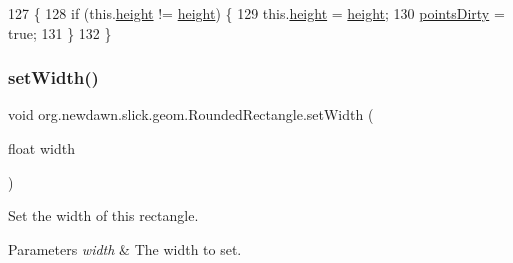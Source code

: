 \begin{DoxyCode}
127                                         \{
128         \textcolor{keywordflow}{if} (this.\mbox{\hyperlink{classorg_1_1newdawn_1_1slick_1_1geom_1_1_rectangle_a3bd010fdce636fc11ed0e0ad4d4b4a0a}{height}} != \mbox{\hyperlink{classorg_1_1newdawn_1_1slick_1_1geom_1_1_rectangle_a3bd010fdce636fc11ed0e0ad4d4b4a0a}{height}}) \{
129             this.\mbox{\hyperlink{classorg_1_1newdawn_1_1slick_1_1geom_1_1_rectangle_a3bd010fdce636fc11ed0e0ad4d4b4a0a}{height}} = \mbox{\hyperlink{classorg_1_1newdawn_1_1slick_1_1geom_1_1_rectangle_a3bd010fdce636fc11ed0e0ad4d4b4a0a}{height}};
130             \mbox{\hyperlink{classorg_1_1newdawn_1_1slick_1_1geom_1_1_shape_a61fe1954d2fdefc72c34b284f4fcfdb4}{pointsDirty}} = \textcolor{keyword}{true};
131         \}
132     \}
\end{DoxyCode}
\mbox{\label{classorg_1_1newdawn_1_1slick_1_1geom_1_1_rounded_rectangle_aa4e064365c4f35fb96ed8f5b58e6c25d}} 
\subsubsection{\texorpdfstring{set\+Width()}{setWidth()}}
{\footnotesize\ttfamily void org.\+newdawn.\+slick.\+geom.\+Rounded\+Rectangle.\+set\+Width (\begin{DoxyParamCaption}\item[{float}]{width }\end{DoxyParamCaption})\hspace{0.3cm}{\ttfamily [inline]}}

Set the width of this rectangle.


\begin{DoxyParams}{Parameters}
{\em width} & The width to set. \\
\hline
\end{DoxyParams}

